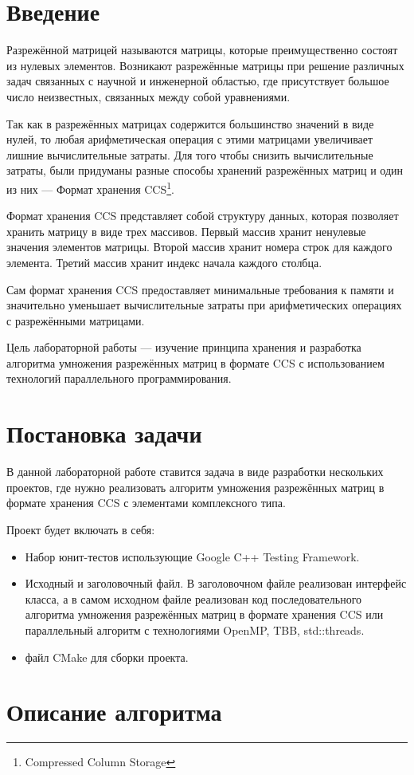 \documentclass[14pt,a4paper,report]{ncc}
\begin{document}
	\section*{Введение}
	
	Разрежённой матрицей называются матрицы, которые преимущественно состоят из нулевых элементов. Возникают разрежённые матрицы при решение различных задач связанных с научной и инженерной областью, где присутствует большое число неизвестных, связанных между собой уравнениями.
	\par Так как в разрежённых матрицах содержится большинство значений в виде нулей, то любая арифметическая операция с этими матрицами увеличивает лишние вычислительные затраты. Для того чтобы снизить вычислительные затраты, были придуманы разные способы хранений разрежённых матриц и один из них --- Формат хранения CCS\footnote{Compressed Column Storage}. 
	\par Формат хранения CCS представляет собой структуру данных, которая позволяет хранить матрицу в виде трех массивов. Первый массив хранит ненулевые значения элементов матрицы. Второй массив хранит номера строк для каждого элемента. Третий массив хранит индекс начала каждого столбца.
	\par Сам формат хранения CCS предоставляет минимальные требования к памяти и значительно уменьшает вычислительные затраты при арифметических операциях с разрежёнными матрицами.
	\par Цель лабораторной работы --- изучение принципа хранения и разработка алгоритма умножения разрежённых матриц в формате CCS с использованием технологий параллельного программирования.
	\newpage
	
	\section*{Постановка задачи}
	В данной лабораторной работе ставится задача в виде разработки нескольких проектов, где нужно реализовать алгоритм умножения разрежённых матриц в формате хранения CCS с элементами комплексного типа.
	\par Проект будет включать в себя:
	\begin{itemize}
		\item Набор юнит-тестов использующие Google C++ Testing Framework.
		\item Исходный и заголовочный файл. В заголовочном файле реализован интерфейс класса, а в самом исходном файле реализован код последовательного алгоритма умножения разрежённых матриц в формате хранения CCS или параллельный алгоритм с технологиями OpenMP, TBB, std::threads.
		\item файл CMake для сборки проекта.
	\end{itemize}
	\newpage
	
	
	\section*{Описание алгоритма}
	
	
	
	
\end{document}
